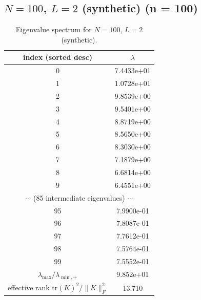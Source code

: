 \subsection*{$N=100$, $L=2$ (synthetic) \quad (n = 100)}
\begin{table}[H]
\centering
\caption{Eigenvalue spectrum for $N=100$, $L=2$ (synthetic).}
\begin{tabular}{c c}
\toprule
index (sorted desc) & $\lambda$ \\
\midrule
0 & 7.4433e+01 \\
1 & 1.0728e+01 \\
2 & 9.8539e+00 \\
3 & 9.5401e+00 \\
4 & 8.8719e+00 \\
5 & 8.5650e+00 \\
6 & 8.3030e+00 \\
7 & 7.1879e+00 \\
8 & 6.6814e+00 \\
9 & 6.4551e+00 \\
\multicolumn{2}{c}{$\cdots$ (85 intermediate eigenvalues) $\cdots$} \\
95 & 7.9900e-01 \\
96 & 7.8087e-01 \\
97 & 7.7612e-01 \\
98 & 7.5764e-01 \\
99 & 7.5552e-01 \\
\midrule
$\lambda_{\max}/\lambda_{\min, +}$ & 9.852e+01 \\
effective rank $\mathrm{tr}(K)^2/\|K\|_F^2$ & 13.710 \\
\bottomrule
\end{tabular}
\end{table}

